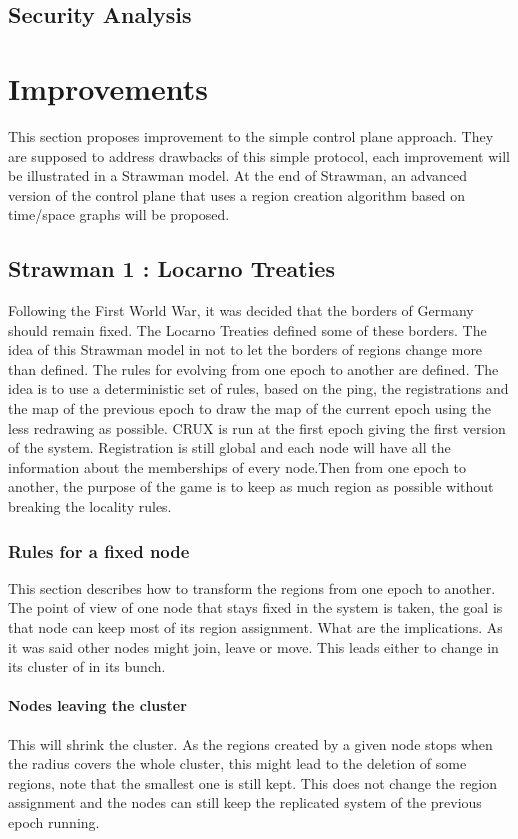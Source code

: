 \documentclass[a4paper,11pt,oneside]{report}
\begin{document}
\section{Security Analysis}


\chapter{Improvements}
This section proposes improvement to the simple control plane approach. They
are supposed to address drawbacks of this simple protocol, each improvement
will be illustrated in a Strawman model. At the end of Strawman, an advanced
version of the control plane that uses a region creation algorithm based on
time/space graphs will be proposed. 

\section{Strawman 1 : Locarno Treaties} \label{Locarno}

Following the First World War, it was decided that the borders of Germany
should remain fixed. The Locarno Treaties defined some of these borders. The
idea of this Strawman model in not to let the borders of regions change more
than defined. The rules for evolving from one epoch to another are defined. The
idea is to use a deterministic set of rules, based on the ping, the
registrations and the map of the previous epoch to draw the map of the current
epoch using the less redrawing as possible. CRUX is run at the first epoch
giving the first version of the system. Registration is still global and each
node will have all the information about the memberships of every node.Then
from one epoch to another, the purpose of the game is to keep as much region as
possible without breaking the locality rules.

\subsection{Rules for a fixed node}
This section describes how to transform the regions from one epoch to another.
The point of view of one node that stays fixed in the system is taken, the goal
is that node can keep most of its region assignment.  What are the
implications. As it was said other nodes might join, leave or move. This leads
either to change in its cluster of in its bunch. 

\subsubsection{Nodes leaving the cluster} 
This will shrink the cluster. As the regions created by a given node stops when
the radius covers the whole cluster, this might lead to the deletion of some
regions, note that the smallest one is still kept. This does not change the
region assignment and the nodes can still keep the replicated system of the
previous epoch running.
\end{document}
